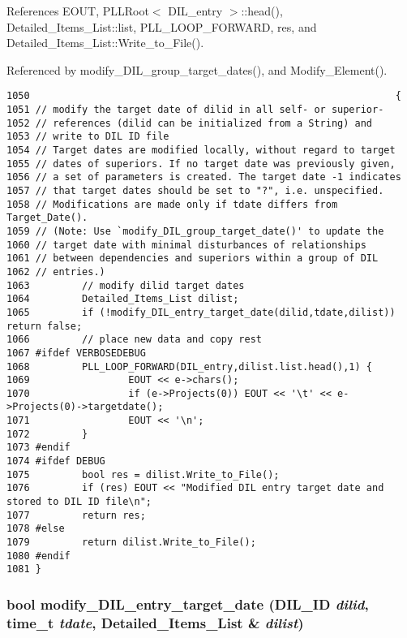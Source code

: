 References EOUT, PLLRoot$<$ DIL\_\-entry $>$::head(), Detailed\_\-Items\_\-List::list, PLL\_\-LOOP\_\-FORWARD, res, and Detailed\_\-Items\_\-List::Write\_\-to\_\-File().

Referenced by modify\_\-DIL\_\-group\_\-target\_\-dates(), and Modify\_\-Element().



\footnotesize\begin{verbatim}1050                                                               {
1051 // modify the target date of dilid in all self- or superior-
1052 // references (dilid can be initialized from a String) and
1053 // write to DIL ID file
1054 // Target dates are modified locally, without regard to target
1055 // dates of superiors. If no target date was previously given,
1056 // a set of parameters is created. The target date -1 indicates
1057 // that target dates should be set to "?", i.e. unspecified.
1058 // Modifications are made only if tdate differs from Target_Date().
1059 // (Note: Use `modify_DIL_group_target_date()' to update the
1060 // target date with minimal disturbances of relationships
1061 // between dependencies and superiors within a group of DIL
1062 // entries.)
1063         // modify dilid target dates
1064         Detailed_Items_List dilist;
1065         if (!modify_DIL_entry_target_date(dilid,tdate,dilist)) return false;
1066         // place new data and copy rest
1067 #ifdef VERBOSEDEBUG
1068         PLL_LOOP_FORWARD(DIL_entry,dilist.list.head(),1) {
1069                 EOUT << e->chars();
1070                 if (e->Projects(0)) EOUT << '\t' << e->Projects(0)->targetdate();
1071                 EOUT << '\n';
1072         }
1073 #endif
1074 #ifdef DEBUG
1075         bool res = dilist.Write_to_File();
1076         if (res) EOUT << "Modified DIL entry target date and stored to DIL ID file\n";
1077         return res;
1078 #else
1079         return dilist.Write_to_File();
1080 #endif
1081 }
\end{verbatim}\normalsize 
{}
\subsubsection{\setlength{\rightskip}{0pt plus 5cm}bool modify\_\-DIL\_\-entry\_\-target\_\-date ({\bf DIL\_\-ID} {\em dilid}, time\_\-t {\em tdate}, {\bf Detailed\_\-Items\_\-List} \& {\em dilist})}\label{dil2al_8hh_a306}




